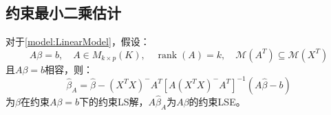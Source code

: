 \subsection{约束最小二乘估计}
\begin{theorem}\label{theo:ConstraintLinearModel}
	对于\cref{model:LinearModel}，假设：
	\begin{equation*}
		A\beta=b,\quad A\in M_{k\times p}(K),\quad\operatorname{rank}(A)=k,\quad\mathcal{M}(A^T)\subseteq\mathcal{M}(X^T)
	\end{equation*}
	且$A\beta=b$相容，则：
	\begin{equation*}
		\hat{\beta}_A=\hat{\beta}-(X^TX)^-A^T[A(X^TX)^-A^T]^{-1}(A\hat{\beta}-b)
	\end{equation*}
	为$\beta$在约束$A\beta=b$下的约束LS解，$A\hat{\beta}_A$为$A\beta$的约束LSE。
\end{theorem}
